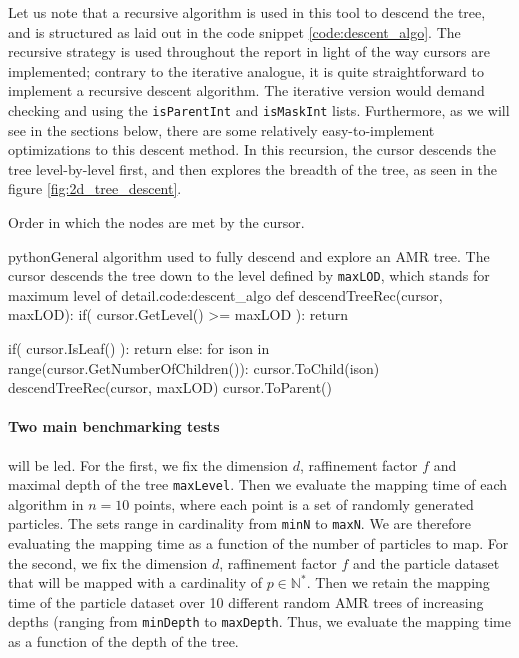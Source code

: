\documentclass[
	a4paper,
	12pt,
	raggedright,
	twoside
]{tufte-style-article}
\theoremstyle{definition}
\theoremstyle{remark}
\begin{document}
Let us note that a recursive algorithm is used in this tool to descend the tree, and is structured as laid out in the code snippet \ref{code:descent_algo}. The recursive strategy is used throughout the report in light of the way cursors are implemented; contrary to the iterative analogue, it is quite straightforward to implement a recursive descent algorithm. The iterative version would demand checking and using the \texttt{isParentInt} and \texttt{isMaskInt} lists. Furthermore, as we will see in the sections below, there are some relatively easy-to-implement optimizations to this descent method. In this recursion, the cursor descends the tree level-by-level first, and then explores the breadth of the tree, as seen in the figure \ref{fig:2d_tree_descent}.

\begin{marginfigure}
    \centering
    
    \caption{Order in which the nodes are met by the cursor. \label{fig:2d_tree_descent}}

\end{marginfigure}

\begin{snippetnum}{python}{General algorithm used to fully descend and explore an \Gls{AMR} tree. The cursor descends the tree down to the level defined by \texttt{maxLOD}, which stands for maximum level of detail.}{code:descent_algo}
def descendTreeRec(cursor, maxLOD):
    if( cursor.GetLevel() >= maxLOD ):
        return

    if( cursor.IsLeaf() ):
        return
    else:
        for ison in range(cursor.GetNumberOfChildren()):
            cursor.ToChild(ison)
            descendTreeRec(cursor, maxLOD)
            cursor.ToParent()
\end{snippetnum}

\paragraph{Two main benchmarking tests} will be led.
For the first, we fix the dimension $d$, raffinement factor $f$ and maximal depth of the tree \texttt{maxLevel}. Then we evaluate the mapping time of each algorithm in $n = 10$ points, where each point is a set of randomly generated particles. The sets range in cardinality from \texttt{minN} to \texttt{maxN}. We are therefore evaluating the mapping time as a function of the number of particles to map.
For the second, we fix the dimension $d$, raffinement factor $f$ and the particle dataset that will be mapped with a cardinality of $p\in \mathbb{N^*}$. Then we retain the mapping time of the particle dataset over 10 different random \Gls{AMR} trees of increasing depths (ranging from \texttt{minDepth} to \texttt{maxDepth}. Thus, we evaluate the mapping time as a function of the depth of the tree.
\end{document}
